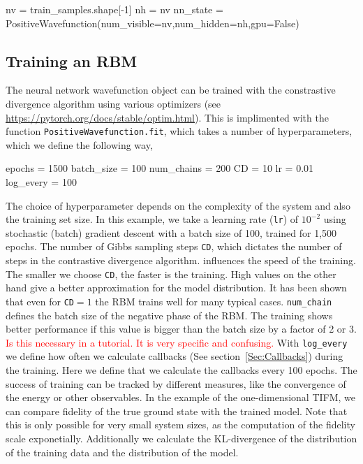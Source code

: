 \documentclass[submission, Phys]{SciPost}
\begin{document}
\begin{python}
nv = train_samples.shape[-1]
nh = nv
nn_state = PositiveWavefunction(num_visible=nv,num_hidden=nh,gpu=False)
\end{python}

\subsection{Training an RBM}

The neural network wavefunction object can be trained with the constrastive divergence algorithm using various optimizers (see \url{https://pytorch.org/docs/stable/optim.html}).
This is implimented with the function \verb|PositiveWavefunction.fit|, which takes a number of hyperparameters, which we define the following way,

\begin{python}
epochs     = 1500
batch_size = 100
num_chains = 200
CD         = 10
lr         = 0.01
log_every  = 100
\end{python}

The choice of hyperparameter depends on the complexity of the system and also the training set size.
In this example, we take a learning rate (\verb|lr|) of $10^{-2}$ using stochastic (batch) gradient descent with a batch size of 100, trained for 1,500 epochs.
The number of Gibbs sampling steps \verb|CD|, which dictates the number of steps in the contrastive divergence algorithm.
influences the speed of the training. The smaller we choose \verb|CD|, the faster is the training. High values on the other hand give a better approximation for the model distribution. It has been shown that even for \verb|CD|$=1$ the RBM trains well for many typical cases\cite{hinton2002training}. \verb|num_chain| defines the batch size of the negative phase of the RBM. The training shows better performance if this value is bigger than the batch size by a factor of 2 or 3. \textcolor{red}{Is this necessary in a tutorial. It is very specific and confusing.} With \verb|log_every| we define how often we calculate callbacks (See section~\ref{Sec:Callbacks}) during the training. Here we define that we calculate the callbacks every 100 epochs.
The success of training can be tracked by different measures, like the convergence of the energy or other observables.
In the example of the one-dimensional TIFM, we can compare fidelity of the true ground state with the trained model.
Note that this is only possible for very small system sizes, as the computation of the fidelity scale exponetially. Additionally we calculate the KL-divergence of the distribution of the training data and the distribution of the model.
\end{document}
